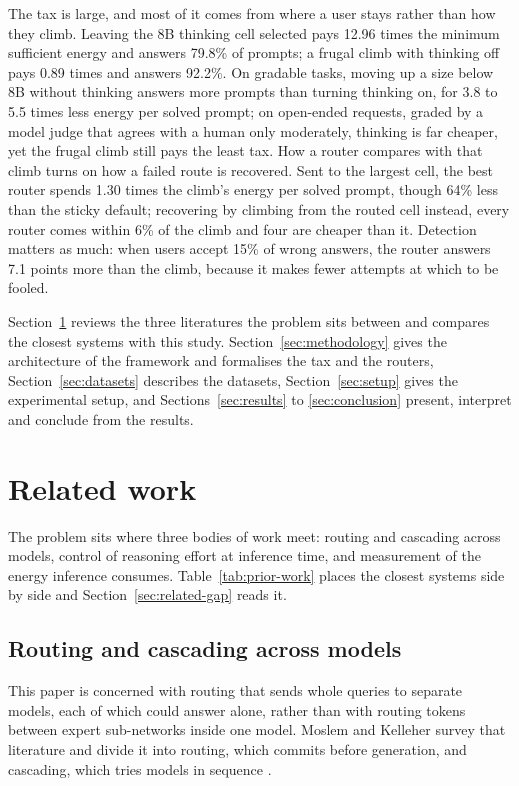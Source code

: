 \documentclass[final,5p,times,twocolumn]{elsarticle}
\theoremstyle{plain}
\begin{document}
The tax is large, and most of it comes from where a user stays rather than
how they climb. Leaving the 8B thinking cell selected pays 12.96 times the
minimum sufficient energy and answers 79.8\% of prompts; a frugal climb with
thinking off pays 0.89 times and answers 92.2\%. On gradable tasks, moving up
a size below 8B without thinking answers more prompts than turning thinking
on, for 3.8 to 5.5 times less energy per solved prompt; on open-ended
requests, graded by a model judge that agrees with a human only moderately,
thinking is far cheaper, yet the frugal climb still pays the least tax. How a
router compares with that climb turns on how a failed route is recovered.
Sent to the largest cell, the best router spends 1.30 times the climb's
energy per solved prompt, though 64\% less than the sticky default;
recovering by climbing from the routed cell instead, every router comes
within 6\% of the climb and four are cheaper than it. Detection matters as
much: when users accept 15\% of wrong answers, the router answers 7.1 points
more than the climb, because it makes fewer attempts at which to be fooled.

Section~\ref{sec:related} reviews the three literatures the problem sits
between and compares the closest systems with this study.
Section~\ref{sec:methodology} gives the architecture of the framework and
formalises the tax and the routers, Section~\ref{sec:datasets} describes the
datasets, Section~\ref{sec:setup} gives the experimental setup, and
Sections~\ref{sec:results} to \ref{sec:conclusion} present, interpret and
conclude from the results.

\section{Related work}
\label{sec:related}

The problem sits where three bodies of work meet: routing and cascading
across models, control of reasoning effort at inference time, and
measurement of the energy inference consumes. Table~\ref{tab:prior-work}
places the closest systems side by side and
Section~\ref{sec:related-gap} reads it.

\subsection{Routing and cascading across models}
\label{sec:related-routing}

This paper is concerned with routing that sends whole queries to separate
models, each of which could answer alone, rather than with routing tokens
between expert sub-networks inside one model. Moslem and Kelleher survey that
literature and divide it into routing, which commits before generation, and
cascading, which tries models in sequence \cite{moslem2026routingsurvey}.
\end{document}
